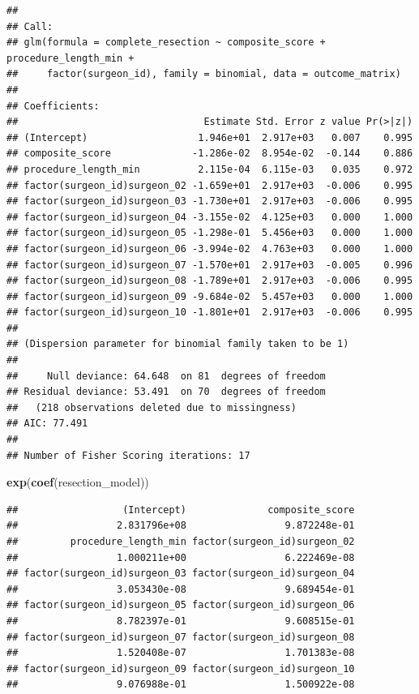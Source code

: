 \documentclass[
]{article}
\newenvironment{Shaded}{\begin{snugshade}}{\end{snugshade}}
\newcommand{\FunctionTok}[1]{\textcolor[rgb]{0.13,0.29,0.53}{\textbf{#1}}}
\newcommand{\NormalTok}[1]{#1}
\begin{document}
\begin{verbatim}
## 
## Call:
## glm(formula = complete_resection ~ composite_score + procedure_length_min + 
##     factor(surgeon_id), family = binomial, data = outcome_matrix)
## 
## Coefficients:
##                                Estimate Std. Error z value Pr(>|z|)
## (Intercept)                   1.946e+01  2.917e+03   0.007    0.995
## composite_score              -1.286e-02  8.954e-02  -0.144    0.886
## procedure_length_min          2.115e-04  6.115e-03   0.035    0.972
## factor(surgeon_id)surgeon_02 -1.659e+01  2.917e+03  -0.006    0.995
## factor(surgeon_id)surgeon_03 -1.730e+01  2.917e+03  -0.006    0.995
## factor(surgeon_id)surgeon_04 -3.155e-02  4.125e+03   0.000    1.000
## factor(surgeon_id)surgeon_05 -1.298e-01  5.456e+03   0.000    1.000
## factor(surgeon_id)surgeon_06 -3.994e-02  4.763e+03   0.000    1.000
## factor(surgeon_id)surgeon_07 -1.570e+01  2.917e+03  -0.005    0.996
## factor(surgeon_id)surgeon_08 -1.789e+01  2.917e+03  -0.006    0.995
## factor(surgeon_id)surgeon_09 -9.684e-02  5.457e+03   0.000    1.000
## factor(surgeon_id)surgeon_10 -1.801e+01  2.917e+03  -0.006    0.995
## 
## (Dispersion parameter for binomial family taken to be 1)
## 
##     Null deviance: 64.648  on 81  degrees of freedom
## Residual deviance: 53.491  on 70  degrees of freedom
##   (218 observations deleted due to missingness)
## AIC: 77.491
## 
## Number of Fisher Scoring iterations: 17
\end{verbatim}

\begin{Shaded}
\begin{Highlighting}[]
\FunctionTok{exp}\NormalTok{(}\FunctionTok{coef}\NormalTok{(resection\_model))}
\end{Highlighting}
\end{Shaded}

\begin{verbatim}
##                  (Intercept)              composite_score 
##                 2.831796e+08                 9.872248e-01 
##         procedure_length_min factor(surgeon_id)surgeon_02 
##                 1.000211e+00                 6.222469e-08 
## factor(surgeon_id)surgeon_03 factor(surgeon_id)surgeon_04 
##                 3.053430e-08                 9.689454e-01 
## factor(surgeon_id)surgeon_05 factor(surgeon_id)surgeon_06 
##                 8.782397e-01                 9.608515e-01 
## factor(surgeon_id)surgeon_07 factor(surgeon_id)surgeon_08 
##                 1.520408e-07                 1.701383e-08 
## factor(surgeon_id)surgeon_09 factor(surgeon_id)surgeon_10 
##                 9.076988e-01                 1.500922e-08
\end{verbatim}
\end{document}
